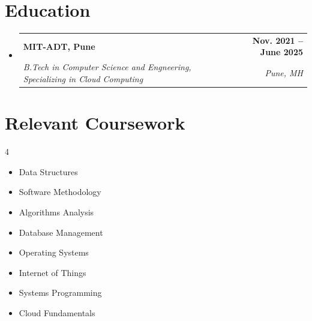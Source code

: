 \documentclass[letterpaper,11pt]{article}
\makeatletter
\newcommand{\resumeItem}[1]{
  \item\small{
    {#1 \vspace{-2pt}}
  }
}
\newcommand{\resumeSubheading}[4]{
  \vspace{-2pt}\item
    \begin{tabular*}{1.0\textwidth}[t]{l@{\extracolsep{\fill}}r}
      \textbf{#1} & \textbf{\small #2} \\
      \textit{\small#3} & \textit{\small #4} \\
    \end{tabular*}\vspace{-7pt}
}
\newcommand{\resumeSubHeadingListStart}{\begin{itemize}[leftmargin=0.0in, label={}]}
\newcommand{\resumeSubHeadingListEnd}{\end{itemize}}
\newcommand{\resumeItemListStart}{\begin{itemize}}
\newcommand{\resumeItemListEnd}{\end{itemize}\vspace{-5pt}}
\makeatother
\begin{document}
\section{Education}
  \resumeSubHeadingListStart
    \resumeSubheading
      {MIT-ADT, Pune}{Nov. 2021 -- June 2025}
      {B.Tech in Computer Science and Engneering, Specializing in Cloud Computing}{Pune, MH}
  \resumeSubHeadingListEnd

\section{Relevant Coursework}
        \begin{multicols}{4}
            \begin{itemize}[itemsep=-5pt, parsep=3pt]
                \item\small Data Structures
                \item Software Methodology 
                \item Algorithms Analysis
                \item Database Management
                \item Operating Systems
                \item Internet of Things
                \item Systems Programming
                \item Cloud Fundamentals
            \end{itemize}
        \end{multicols}
        \vspace*{2.0\multicolsep}



\end{document}
